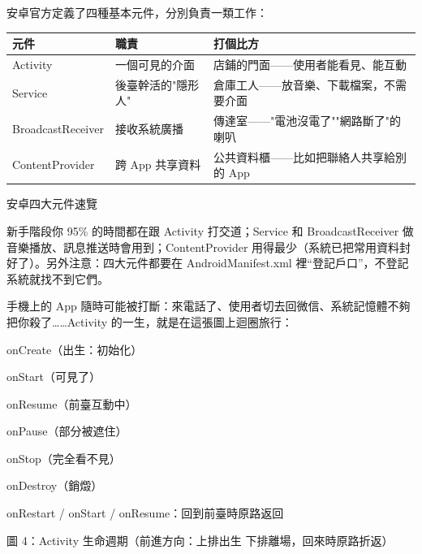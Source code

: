 


安卓官方定義了四種基本元件，分別負責一類工作：

\begin{center}
\begin{tabularx}{\linewidth}{|X|X|X|}
\hline
\textbf{元件} & \textbf{職責} & \textbf{打個比方} \tabularnewline
\hline
Activity & 一個可見的介面 & 店鋪的門面——使用者能看見、能互動 \tabularnewline
Service & 後臺幹活的"隱形人" & 倉庫工人——放音樂、下載檔案，不需要介面 \tabularnewline
BroadcastReceiver & 接收系統廣播 & 傳達室——"電池沒電了""網路斷了"的喇叭 \tabularnewline
ContentProvider & 跨 App 共享資料 & 公共資料櫃——比如把聯絡人共享給別的 App \tabularnewline
\hline
\end{tabularx}
\end{center}

\begin{center}\small\color{gray}安卓四大元件速覽\end{center}

新手階段你 95\% 的時間都在跟 Activity 打交道；Service 和 BroadcastReceiver 做音樂播放、訊息推送時會用到；ContentProvider 用得最少（系統已把常用資料封好了）。另外注意：四大元件都要在 AndroidManifest.xml 裡“登記戶口”，不登記系統就找不到它們。


手機上的 App 隨時可能被打斷：來電話了、使用者切去回微信、系統記憶體不夠把你殺了……Activity 的一生，就是在這張圖上迴圈旅行：

onCreate（出生：初始化）

onStart（可見了）

onResume（前臺互動中）

onPause（部分被遮住）

onStop（完全看不見）

onDestroy（銷燬）

onRestart / onStart / onResume：回到前臺時原路返回

\begin{center}\small\color{gray}圖 4：Activity 生命週期（前進方向：上排出生 下排離場，回來時原路折返）\end{center}

